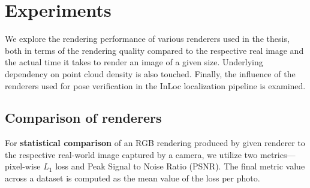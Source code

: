 \section{Experiments} %

We explore the rendering performance of various renderers used in the thesis,
both in terms of the rendering quality compared to the respective real image
and the actual time it takes to render an image of a given size. Underlying
dependency on point cloud density is also touched. Finally, the influence of the
renderers used for pose verification in the InLoc localization pipeline is examined.


\subsection{Comparison of renderers}

For \textbf{statistical comparison} of an RGB rendering produced by
given renderer to the
respective real-world image captured by a camera, we utilize two
metrics---pixel-wise $L_1$ loss and Peak Signal to Noise Ratio (PSNR). The final metric
value across a dataset is computed as the mean value of the loss per photo.

